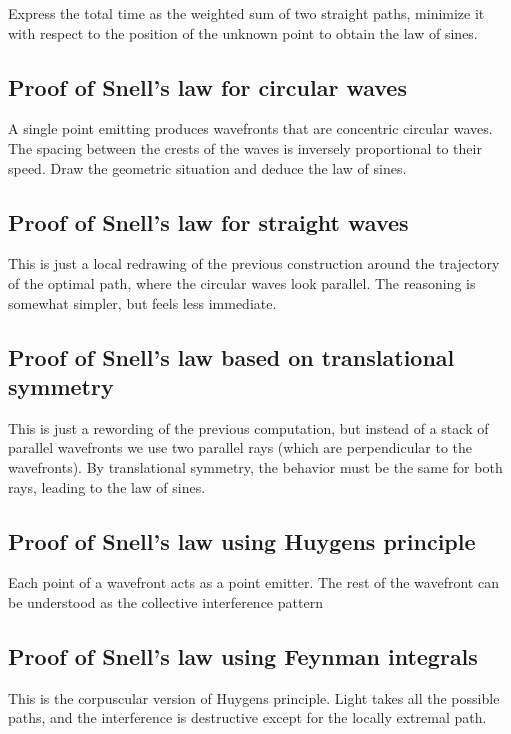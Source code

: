 Express the total time as the weighted sum of two straight paths, minimize it
with respect to the position of the unknown point to obtain the law of sines.

\subsection{Proof of Snell's law for circular waves}

A single point emitting produces wavefronts that are concentric circular
waves.  The spacing between the crests of the waves is inversely proportional
to their speed.  Draw the geometric situation and deduce the law of sines.

\subsection{Proof of Snell's law for straight waves}

This is just a local redrawing of the previous construction around the
trajectory of the optimal path, where the circular waves look parallel.
The reasoning is somewhat simpler, but feels less immediate.

\subsection{Proof of Snell's law based on translational symmetry}

This is just a rewording of the previous computation, but instead of a stack
of parallel wavefronts we use two parallel rays (which are perpendicular to
the wavefronts).  By translational symmetry, the behavior must be the same
for both rays, leading to the law of sines.

\subsection{Proof of Snell's law using Huygens principle}

Each point of a wavefront acts as a point emitter.  The rest of the wavefront
can be understood as the collective interference pattern


\subsection{Proof of Snell's law using Feynman integrals}

This is the corpuscular version of Huygens principle.  Light takes all the
possible paths, and the interference is destructive except for the locally
extremal path.



